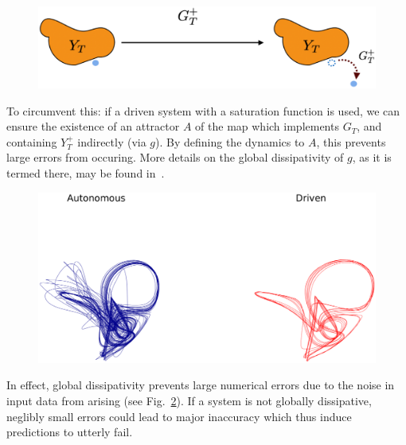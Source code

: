 \begin{figure}[ht]
  \includegraphics[scale=0.25]{Graphs/_YTerrors.eps}
  \centering
\label{fig:YtGtFailure}
\end{figure}

To circumvent this: if a driven system with a saturation function is used, we can ensure the existence of an attractor $A$ of the map which implements $G_T$, and containing $Y_T^+$ indirectly (via $g$).  
By defining the dynamics to $A$, this prevents large errors from occuring.  
More details on the global dissipativity of $g$, as it is termed there, may be found in~\cite{Supp}.

\begin{figure}[ht]
  \includegraphics[scale=0.25]{Graphs/_autovsdriven.eps}
  \centering
 \label{fig:learningFailure}
\end{figure}

In effect, global dissipativity prevents large numerical errors due to the noise in input data from arising (see Fig.~\ref{fig:learningFailure}). 
If a system is not globally dissipative, neglibly small errors could lead to major inaccuracy which thus induce predictions to utterly fail.


